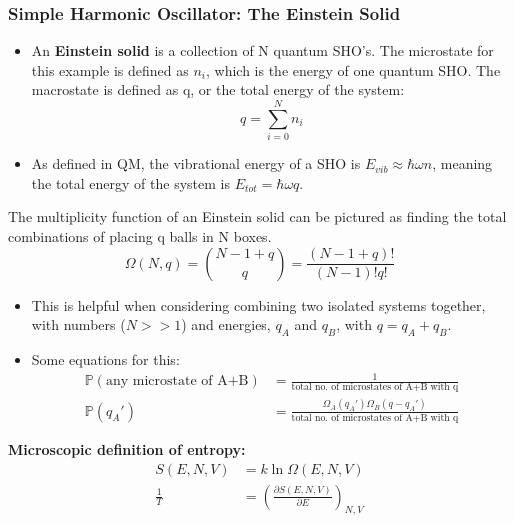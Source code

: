 \documentclass[12pt, letterpaper, twoside]{article}
\begin{document}
\subsubsection{Simple Harmonic Oscillator: The Einstein Solid}

\begin{itemize}
    \item An \textbf{Einstein solid} is a collection of N quantum SHO's. The microstate for this example is defined as $n_i$, which is the energy of one quantum SHO. The macrostate is defined as q, or the total energy of the system: 
    \begin{equation*}
        q = \sum_{i=0}^Nn_i
    \end{equation*}
    \item As defined in QM, the vibrational energy of a SHO is $E_{vib} \approx \hbar\omega n$, meaning the total energy of the system is $E_{tot} = \hbar\omega q$.
\end{itemize}
\begin{tcolorbox}[enhanced, boxrule = 0pt, frame hidden]
    The multiplicity function of an Einstein solid can be pictured as finding the total combinations of placing q balls in N boxes.
    \begin{equation}
        \Omega(N, q) = {N-1+q \choose q} = \frac{(N-1+q)!}{(N-1)!q!}
    \end{equation}
\end{tcolorbox}
\begin{itemize}
    \item This is helpful when considering combining two isolated systems together, with numbers ($N >> 1$) and energies, $q_A$ and $q_B$, with $q = q_A + q_B$.
    \item Some equations for this:
    \begin{align*}
        \mathbb{P}(\text{any microstate of A+B}) &= \frac{1}{\text{total no. of microstates of A+B with q}}\\
        \mathbb{P}(q_A') &= \frac{\Omega_A(q_A')\Omega_B(q-q_A')}{\text{total no. of microstates of A+B with q}}
    \end{align*}
\end{itemize}
\begin{tcolorbox}[enhanced, boxrule = 0pt, frame hidden]
    \textbf{Microscopic definition of entropy:}
    \begin{align}
        S(E, N, V) &= k\ln{\Omega(E,N,V)} \\
        \frac{1}{T} &= (\frac{\partial S(E, N, V)}{\partial E})_{N,V}
    \end{align}
\end{tcolorbox}
\end{document}
